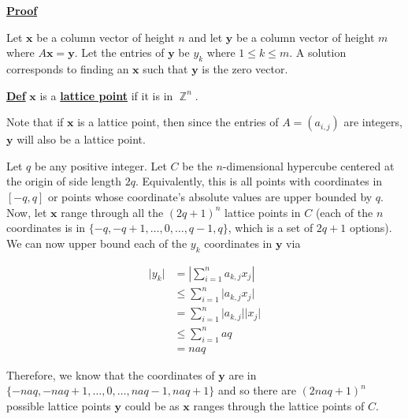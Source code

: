 \documentclass[a4paper, 11pt]{book}
\newcommand{\vocab}[1]{\underline{\textbf{#1}}\index{#1}}
\newcommand{\defn}{\underline{\textbf{Def}} }
\newcommand{\proof}{\underline{\textbf{Proof}} }
\DeclareMathOperator{\Z}{\mathbb{Z}}
\begin{document}
\proof{Let $\mathbf{x}$ be a column vector of height $n$ and let $\mathbf{y}$ be a column vector of height $m$ where $A\mathbf{x} = \mathbf{y}$. Let the entries of $\mathbf{y}$ be $y_k$ where $1 \leq k \leq m$. A solution corresponds to finding an $\mathbf{x}$ such that $\mathbf{y}$ is the zero vector.\par


\defn{$\mathbf{x}$ is a \vocab{lattice point} if it is in $\Z^{n}$.}\par

Note that if $\mathbf{x}$ is a lattice point, then since the entries of $A = (a_{i,j})$ are integers, $\mathbf{y}$ will also be a lattice point.\par

Let $q$ be any positive integer. Let $C$ be the $n$-dimensional hypercube centered at the origin of side length $2q$. Equivalently, this is all points with coordinates in $[-q, q]$ or points whose coordinate's absolute values are upper bounded by $q$. Now, let $\mathbf{x}$ range through all the ${(2q+1)}^{n}$ lattice points in $C$ (each of the $n$ coordinates is in $\{-q, -q + 1, \ldots, 0, \ldots, q-1, q\}$, which is a set of $2q+1$ options). We can now upper bound each of the $y_k$ coordinates in $\mathbf{y}$ via

\begin{align*}
    \vert y_k \vert &= \left\vert \sum_{i=1}^{n} a_{k,j}x_j \right\vert \\
                    &\leq \sum_{i=1}^{n} \vert a_{k,j}x_j \vert \\
                    &= \sum_{i=1}^{n} \vert a_{k,j} \vert \vert x_j \vert \\
                    &\leq \sum_{i=1}^{n} aq \\
                    &= naq
\end{align*}

Therefore, we know that the coordinates of $\mathbf{y}$ are in $\{-naq, -naq+1, \ldots, 0, \ldots, naq-1, naq+1\}$ and so there are ${(2naq + 1)}^{n}$ possible lattice points $\mathbf{y}$ could be as $\mathbf{x}$ ranges through the lattice points of $C$.\par

}
\end{document}
